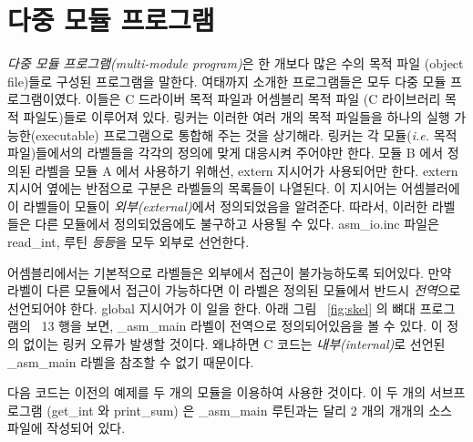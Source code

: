 
\section{다중 모듈 프로그램}

\emph{다중 모듈 프로그램(multi-module program)}은 한 개보다 많은 수의
목적 파일 (object file)들로 구성된 프로그램을 말한다. 여태까지 소개한 프로그램들은
모두 다중 모듈 프로그램이였다. 이들은 C 드라이버 목적 파일과 어셈블리 목적 파일
(C 라이브러리 목적 파일도)들로 이루어져 있다. 링커는 이러한 여러 개의 목적 파일들을
하나의 실행 가능한(executable) 프로그램으로 통합해 주는 것을 상기해라. 링커는
각 모듈(\emph{i.e.} 목적 파일)들에서의 라벨들을 각각의 정의에 맞게 대응시켜 주어야만 한다.
모듈 B 에서 정의된 라벨을 모듈 A 에서 사용하기 위해선, {\code extern} 지시어가 사용되어만
한다. {\code extern}  지시어 옆에는 반점으로 구분은 라벨들의 목록들이
나열된다. 이 지시어는 어셈블러에 이 라벨들이 모듈이 \emph{외부(external)}에서 
정의되었음을 알려준다. 따라서, 이러한 라벨들은 다른 모듈에서 정의되었음에도 불구하고
사용될 수 있다. {\code asm\_io.inc} 파일은 {\code read\_int}, 루틴 \emph{등등}을 모두 외부로
선언한다. 

어셈블리에서는 기본적으로 라벨들은 외부에서 접근이 불가능하도록 되어있다. 만약 라벨이 다른
모듈에서 접근이 가능하다면 이 라벨은 정의된 모듈에서 반드시 \emph{전역}으로 선언되어야
한다. {\code global}  지시어가 이 일을 한다. 아래 그림 ~\ref{fig:skel} 의
뼈대 프로그램의 ~13 행을 보면, {\code \_asm\_main} 라벨이 전역으로 정의되어있음을 볼 수 
있다. 이 정의 없이는 링커 오류가 발생할 것이다. 왜냐하면 C 코드는 \emph{내부(internal)}로 선언된
{\code \_asm\_main} 라벨을 참조할 수 없기 때문이다. 

다음 코드는 이전의 예제를 두 개의 모듈을 이용하여 사용한 것이다. 이 두 개의 서브프로그램
({\code get\_int} 와 {\code print\_sum}) 은 {\code \_asm\_main} 루틴과는 달리 2 개의 개개의
소스 파일에 작성되어 있다. 

